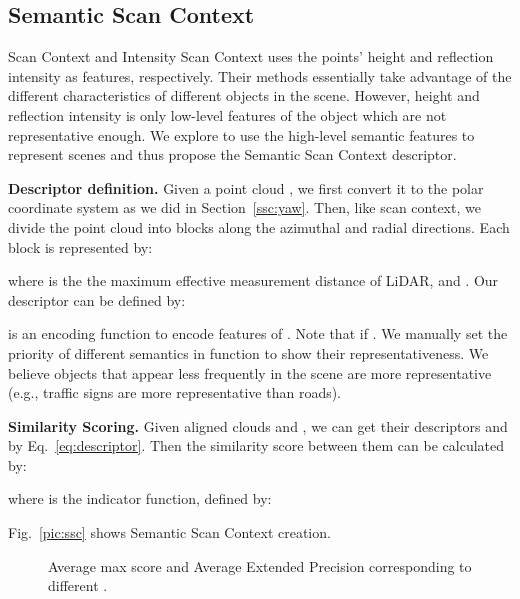 \documentclass[letterpaper, 10 pt, conference]{ieeeconf}
\begin{document}
\subsection{Semantic Scan Context}
Scan Context and Intensity Scan Context uses the points' height and reflection intensity as features, respectively. Their methods essentially take advantage of the different characteristics of different objects in the scene. However, height and reflection intensity is only low-level features of the object which are not representative enough. We explore to use the high-level semantic features to represent scenes and thus propose the Semantic Scan Context descriptor.

\smallskip\noindent\textbf{Descriptor definition.} Given a point cloud , we first convert it to the polar coordinate system as we did in Section~\ref{ssc:yaw}. Then, like scan context, we divide the point cloud into  blocks along the azimuthal and radial directions. Each block is represented by:

where  is the the maximum effective measurement distance of LiDAR,  and . Our descriptor can be defined by:

 is an encoding function to encode features of . Note that if . We manually set the priority of different semantics in function  to show their representativeness. We believe objects that appear less frequently in the scene are more representative (e.g., traffic signs are more representative than roads). 

\smallskip\noindent\textbf{Similarity Scoring.} Given aligned clouds  and , we can get their descriptors  and  by Eq.~\ref{eq:descriptor}. Then the similarity score between them can be calculated by:
\begin{small}

\end{small}
where  is the indicator function, defined by:

Fig.~\ref{pic:ssc} shows Semantic Scan Context creation. 



    \begin{figure*}[htb]
        \centering
            \vspace{-3mm}
        \caption{Average  max score and Average Extended Precision corresponding to different .}
        \label{pic:F1}
     \end{figure*}
\end{document}
